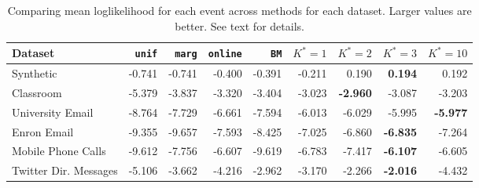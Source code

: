 \begin{table}[t]
\begin{center}
{\footnotesize
\begin{tabular}{lrrrrrrrr}
  \hline
Dataset & \texttt{unif} & \texttt{marg} & \texttt{online} & \texttt{BM} & $K^*=1$ & $K^*=2$ & $K^*=3$ & $K^*=10$ \\ 
  \hline
Synthetic & -0.741 & -0.741 & -0.400 & -0.391 & -0.211 & 0.190 & \textbf{0.194} & 0.192 \\ 
  Classroom & -5.379 & -3.837 & -3.320 & -3.404 & -3.023 & \textbf{-2.960} & -3.087 & -3.203 \\ 
  University Email & -8.764 & -7.729 & -6.661 & -7.594 & -6.013 & -6.029 & -5.995 & \textbf{-5.977} \\ 
  Enron Email & -9.355 & -9.657 & -7.593 & -8.425 & -7.025 & -6.860 & \textbf{-6.835} & -7.264 \\ 
  Mobile Phone Calls & -9.612 & -7.756 & -6.607 & -9.619 & -6.783 & -7.417 & \textbf{-6.107} & -6.605 \\ 
  Twitter Dir. Messages & -5.106 & -3.662 & -4.216 & -2.962 & -3.170 & -2.266 & \textbf{-2.016} & -4.432 \\ 
   \hline
\end{tabular}
}
\caption{Comparing mean loglikelihood for each event across methods for each dataset.  Larger values are better.  See text for details.}
\label{tab:results}
\end{center}
\end{table}
